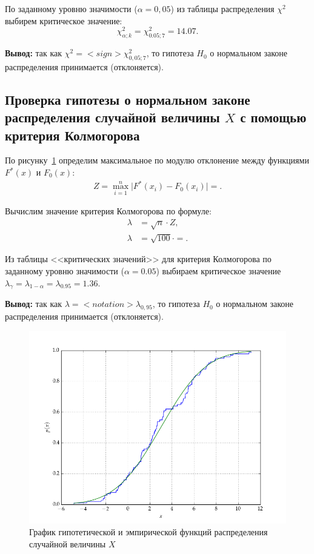 \documentclass[14pt,hidelinks]{extarticle}
\begin{document}
По заданному уровню значимости ($\alpha = 0,05$) из таблицы распределения $\chi^2$ выбирем критическое значение:
\begin{equation*}
  \chi^2_{\alpha; k} = \chi^2_{0.05; 7} = 14.07.
\end{equation*}

\textbf{Вывод:} так как $\chi^2 =  {<}sign{>} \chi^2_{0,05;7} $, то гипотеза $H_0$ о нормальном законе распределения принимается (отклоняется). 


\subsection{Проверка гипотезы о нормальном законе распределения 
  случайной величины $ X $ с помощью критерия Колмогорова}

По рисунку~\ref{fig:sample_normal} определим максимальное по модулю отклонение между функциями $F^*(x)$ и $F_0(x)$:
\begin{align}
	Z = \max_{i=1}^n \Big| F^*(x_i) - F_0(x_i) \Big| = .
\end{align}

Вычислим значение критерия Колмогорова по формуле:
\begin{align}
  \lambda &= \sqrt{n} \cdot Z, \\ \nonumber
  \lambda &= \sqrt{100} \cdot  = .
\end{align}

Из таблицы <<критических значений>> для критерия Колмогорова по заданному уровню значимости ($\alpha = 0.05$)
выбираем критическое значение $\lambda_{\gamma} = \lambda_{1-\alpha} = \lambda_{0.95} = 1.36 $.

\textbf{Вывод:} так как $\lambda =  {<}notation{>} \lambda_{0,95} $, то гипотеза $H_0$ о нормальном законе распределения принимается (отклоняется).

\newpage
\fancyhf{}
\begin{landscape}
  \begin{figure}[H]
    \centering
    \includegraphics[width=0.9\linewidth]{pic/sample_normal.png}
    \caption{График гипотетической и эмпирической функций распределения случайной величины $ X $\label{fig:sample_normal}}
  \end{figure}
\end{landscape}
\restoregeometry
\end{document}
